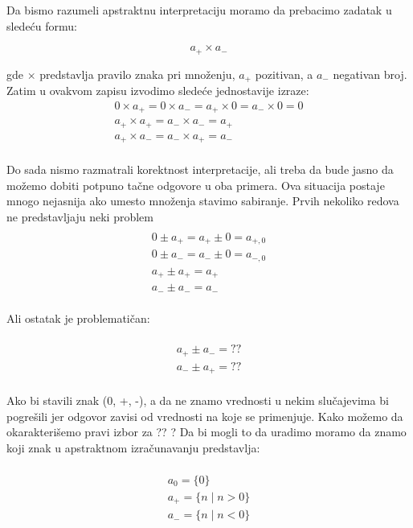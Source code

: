 Da bismo razumeli apstraktnu interpretaciju moramo da prebacimo zadatak u sledeću formu:

\begin{equation}
  a_{+} \times a_{-}
\end{equation}

gde $\times$ predstavlja pravilo znaka pri množenju, $a_{+}$ pozitivan, a $a_{-}$ negativan broj. Zatim u ovakvom zapisu izvodimo sledeće jednostavije izraze:  \\

\begin{multline}
  	0 \times a_{+} = 0 \times a_{-} = a_{+} \times 0 = a_{-} \times 0 = 0 \\
  	a_{+} \times a_{+} = a_{-} \times a_{-} = a_{+} \\
  	a_{+} \times a_{-} = a_{-} \times a_{+} = a_{-} \\
\end{multline}

Do sada nismo razmatrali korektnost interpretacije, ali treba da bude jasno da možemo dobiti potpuno tačne odgovore u oba primera. Ova situacija postaje mnogo nejasnija ako umesto množenja stavimo sabiranje. Prvih nekoliko redova ne pred\-stavljaju neki problem \\

\begin{multline} \\
	0 \pm a_{+} = a_{+} \pm 0 = a_{+,0} \\ 
	0 \pm a_{-} = a_{-} \pm 0 = a_{-,0} \\ 
	a_{+} \pm a_{+} = a_{+}  \\ 
	a_{-} \pm a_{-} = a_{-}  \\ 
\end{multline}


Ali ostatak je problematičan:

\begin{multline}	\\
	a_{+} \pm a_{-} = ?? \\ 
	a_{-} \pm a_{+} = ?? \\ 
\end{multline}

Ako bi stavili znak (0, +, -), a da ne znamo vrednosti u nekim slu\-čajevima bi pogrešili jer odgovor zavisi od vrednosti na koje se primenjuje. Kako možemo da okarakterišemo pravi izbor za ?? ? Da bi mogli to da uradimo moramo da znamo koji znak u apstraktnom izračunavanju predstavlja:

\begin{multline}	\\
	a_{0} = \{0\}				\\    
	a_{+} = \{n \mid n > 0\}		\\	
	a_{-} = \{n \mid n < 0\}		\\
\end{multline}

